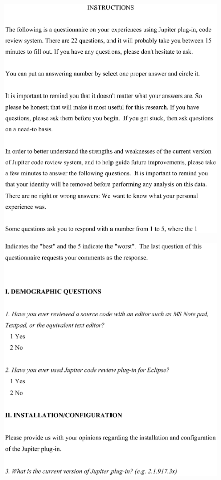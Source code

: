 \begin{figure}[htbp]
  \centering
  \includegraphics[width=1.0\textwidth]{figures/JupiterQuestionnaire_4.eps}
  \label{fig:JupiterQuestionnaire_4}
\end{figure}

\begin{figure}[htbp]
  \centering
  \includegraphics[width=1.0\textwidth]{figures/JupiterQuestionnaire_5.eps}
  \label{fig:JupiterQuestionnaire_5}
\end{figure}

